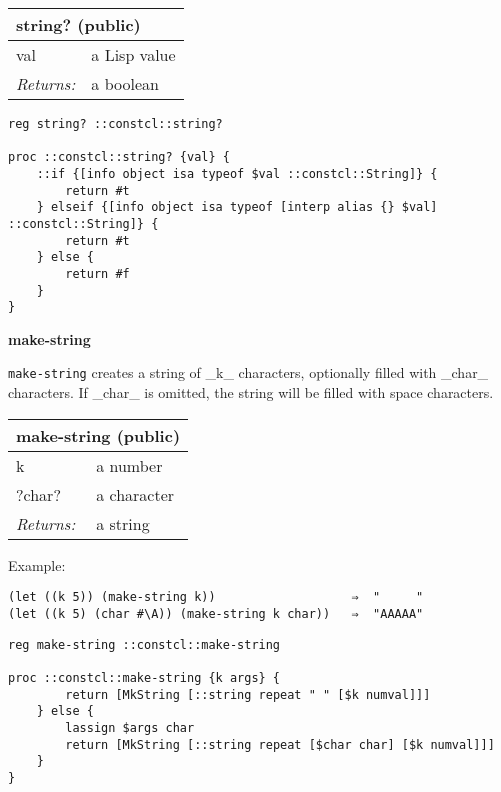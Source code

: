 \documentclass{report}
\begin{document}
\noindent\makebox[\linewidth]{\rule{\linewidth}{0.4pt}}
\begin{tabular}{ |l l| }
\hline
\multicolumn{2}{|l|}{string? (public)} \\
\hline
val & a Lisp value \\
\textit{Returns:} & a boolean \\
\hline
\end{tabular}

\noindent\makebox[\linewidth]{\rule{\linewidth}{0.4pt}}
\begin{lstlisting}
reg string? ::constcl::string?
 
proc ::constcl::string? {val} {
    ::if {[info object isa typeof $val ::constcl::String]} {
        return #t
    } elseif {[info object isa typeof [interp alias {} $val] ::constcl::String]} {
        return #t
    } else {
        return #f
    }
}
\end{lstlisting}
\noindent\makebox[\linewidth]{\rule{\linewidth}{0.4pt}}

\textbf{make-string}


\texttt{make-string} creates a string of \_k\_ characters, optionally filled with \_char\_ characters. If \_char\_ is omitted, the string will be filled with space characters.

\begin{tabular}{ |l l| }
\hline
\multicolumn{2}{|l|}{make-string (public)} \\
\hline
k & a number \\
?char? & a character \\
\textit{Returns:} & a string \\
\hline
\end{tabular}


Example:

\noindent\makebox[\linewidth]{\rule{\linewidth}{0.4pt}}
\begin{lstlisting}
(let ((k 5)) (make-string k))                   ⇒  "     "
(let ((k 5) (char #\A)) (make-string k char))   ⇒  "AAAAA"
\end{lstlisting}
\noindent\makebox[\linewidth]{\rule{\linewidth}{0.4pt}}
\noindent\makebox[\linewidth]{\rule{\linewidth}{0.4pt}}
\begin{lstlisting}
reg make-string ::constcl::make-string
 
proc ::constcl::make-string {k args} {
        return [MkString [::string repeat " " [$k numval]]]
    } else {
        lassign $args char
        return [MkString [::string repeat [$char char] [$k numval]]]
    }
}
\end{lstlisting}
\noindent\makebox[\linewidth]{\rule{\linewidth}{0.4pt}}
\end{document}

